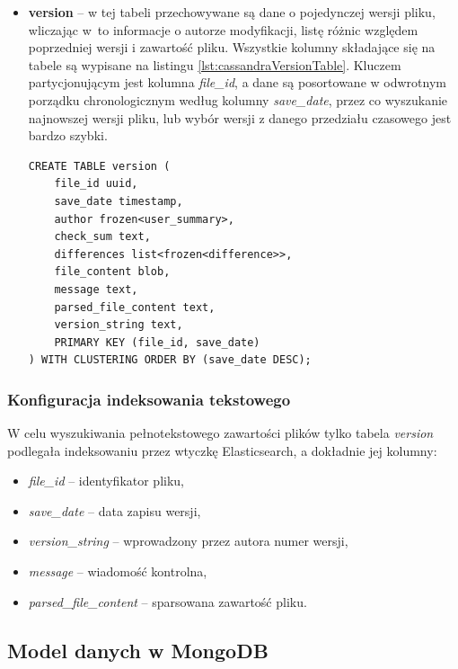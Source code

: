 \begin{itemize}
    \item \textbf{version} -- w tej tabeli przechowywane są dane o pojedynczej wersji pliku, wliczając w~to informacje o autorze modyfikacji, listę różnic względem poprzedniej wersji i zawartość pliku.
    Wszystkie kolumny składające się na tabele są wypisane na listingu \ref{lst:cassandraVersionTable}.
    Kluczem partycjonującym jest kolumna \textit{file\_id}, a dane są posortowane w odwrotnym porządku chronologicznym według kolumny \textit{save\_date}, przez co wyszukanie najnowszej wersji pliku, lub wybór wersji z danego przedziału czasowego jest bardzo szybki.
    
    \begin{minipage}{\linewidth}
    \begin{lstlisting}[language=CQL,caption={Definicja tabeli \textit{version}},label={lst:cassandraVersionTable}]
CREATE TABLE version (
    file_id uuid,
    save_date timestamp,
    author frozen<user_summary>,
    check_sum text,
    differences list<frozen<difference>>,
    file_content blob,
    message text,
    parsed_file_content text,
    version_string text,
    PRIMARY KEY (file_id, save_date)
) WITH CLUSTERING ORDER BY (save_date DESC);
    \end{lstlisting}
    \end{minipage}
\end{itemize}

\subsubsection{Konfiguracja indeksowania tekstowego} \label{sec:cassandraTextIndexConfig}

W celu wyszukiwania pełnotekstowego zawartości plików tylko tabela \textit{version} podlegała indeksowaniu przez wtyczkę Elasticsearch,
a dokładnie jej kolumny:
\begin{itemize}
    \item \textit{file\_id} -- identyfikator pliku,
    \item \textit{save\_date} -- data zapisu wersji,
    \item \textit{version\_string} -- wprowadzony przez autora numer wersji,
    \item \textit{message} -- wiadomość kontrolna,
    \item \textit{parsed\_file\_content} -- sparsowana zawartość pliku.
\end{itemize}

\subsection{Model danych w MongoDB}

